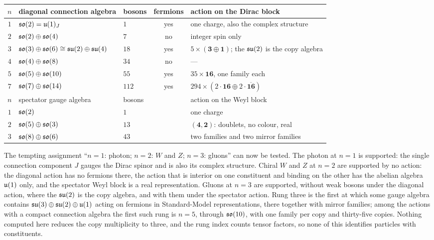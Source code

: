 \begin{center}
\small
\begin{tabular}{@{}cllcl@{}}
\toprule
$n$ & diagonal connection algebra & bosons & fermions & action on the Dirac block\\
\midrule
$1$ & $\mathfrak{so}(2)=\mathfrak{u}(1)_J$ & $1$ & yes & one charge, also the complex structure\\
$2$ & $\mathfrak{so}(2)\oplus\mathfrak{so}(4)$ & $7$ & no & integer spin only\\
$3$ & $\mathfrak{so}(3)\oplus\mathfrak{so}(6)\cong\mathfrak{su}(2)\oplus\mathfrak{su}(4)$ & $18$ & yes & $5\times(\mathbf3\oplus\mathbf1)$; the $\mathfrak{su}(2)$ is the copy algebra\\
$4$ & $\mathfrak{so}(4)\oplus\mathfrak{so}(8)$ & $34$ & no & ---\\
$5$ & $\mathfrak{so}(5)\oplus\mathfrak{so}(10)$ & $55$ & yes & $35\times\mathbf{16}$, one family each\\
$7$ & $\mathfrak{so}(7)\oplus\mathfrak{so}(14)$ & $112$ & yes & $294\times(2\cdot\mathbf{16}\oplus2\cdot\overline{\mathbf{16}})$\\
\midrule
$n$ & spectator gauge algebra & bosons & & action on the Weyl block\\
\midrule
$1$ & $\mathfrak{so}(2)$ & $1$ & & one charge\\
$2$ & $\mathfrak{so}(5)\oplus\mathfrak{so}(3)$ & $13$ & & $(\mathbf4,\mathbf2)$: doublets, no colour, real\\
$3$ & $\mathfrak{so}(8)\oplus\mathfrak{so}(6)$ & $43$ & & two families and two mirror families\\
\bottomrule
\end{tabular}
\end{center}
The tempting assignment ``$n=1$: photon; $n=2$: $W$ and $Z$; $n=3$: gluons'' can now be tested. The photon at $n=1$ is supported: the single
connection component $J$ gauges the Dirac spinor and is also its complex structure. Chiral $W$ and $Z$ at $n=2$ are supported by no action: the
diagonal action has no fermions there, the action that is interior on one constituent and binding on the other has the abelian algebra $\mathfrak{u}(1)$ only, and
the spectator Weyl block is a real representation. Gluons at $n=3$ are supported, without weak bosons under the diagonal action, where the $\mathfrak{su}(2)$ is
the copy algebra, and with them under the spectator action. Rung three is the first at which some gauge algebra contains
$\mathfrak{su}(3)\oplus\mathfrak{su}(2)\oplus\mathfrak{u}(1)$ acting on fermions in Standard-Model representations, there together with mirror families; among the actions with a compact
connection algebra the first such rung is $n=5$, through $\mathfrak{so}(10)$, with one family per copy and thirty-five copies. Nothing computed here reduces the
copy multiplicity to three, and the rung index counts tensor factors, so none of this identifies particles with constituents.

